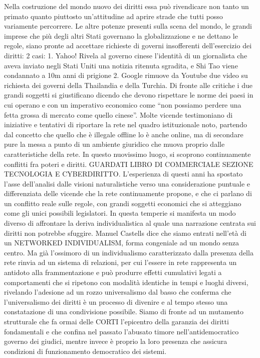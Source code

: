 Nella costruzione del mondo nuovo dei diritti essa può rivendicare non tanto un primato quanto piuttosto un’attitudine ad aprire strade che tutti posso variamente percorrere. Le altre potenze presenti sulla scena del mondo, le grandi imprese che più degli altri Stati governano la globalizzazione e ne dettano le regole, siano pronte ad accettare richieste di governi insofferenti dell’esercizio dei diritti: 2 casi:
1.	Yahoo! Rivela al governo cinese l’identità di un giornalista che aveva inviato negli Stati Uniti una notizia ritenuta sgradita, e Shi Tao viene condannato a 10m anni di prigione
2.	Google rimuove da Youtube due video su richiesta dei governi della Thailandia e della Turchia. 
Di fronte alle critiche i due grandi soggetti si giustificano dicendo che devono rispettare le norme dei paesi in cui operano e con un imperativo economico come “non possiamo perdere una fetta grossa di mercato come quello cinese”.
Molte vicende testimoniano di iniziative e tentativi di riportare la rete nel quadro istituzionale noto, partendo dal concetto che quello che è illegale offline lo è anche online, ma di secondare pure la messa a punto di un ambiente giuridico che muova proprio dalle caratteristiche della rete. In questo nuovissimo luogo, si scoprono continuamente conflitti fra poteri e diritti.
GUARDATI LIBRO DI COMMERCIALE SEZIONE TECNOLOGIA E CYBERDIRITTO.
L’esperienza di questi anni ha spostato l’asse dell’analisi dalle visioni naturalistiche verso una considerazione puntuale e differenziata delle vicende che la rete continuamente propone, e che ci parlano di un conflitto reale sulle regole, con grandi soggetti economici che si atteggiano come gli unici possibili legislatori.
In questa temperie si manifesta un modo diverso di affrontare la deriva individualistica al quale una narrazione centrata sui diritti non potrebbe sfuggire. Manuel Castells dice che siamo entrati nell’età di un NETWORKED INDIVIDUALISM, forma congeniale ad un mondo senza centro.
Ma già l’ossimoro di un individualismo caratterizzato dalla presenza della rete rinvia ad un sistema di relazioni, per cui l’essere in rete rappresenta un antidoto alla frammentazione e può produrre effetti cumulativi legati a comportamenti che si ripetono con modalità identiche in tempi e luoghi diversi, rivelando l’adesione ad un rozzo universalismo dal basso che conferma che l’universalismo dei diritti è un processo di divenire e al tempo stesso una constatazione di una condivisione possibile.
Siamo di fronte ad un mutamento strutturale che fa ormai delle CORTI l’epicentro della garanzia dei diritti fondamentali e che confina nel passato l’abusato timore nell’antidemocratico governo dei giudici, mentre invece è proprio la loro presenza che assicura condizioni di funzionamento democratico dei sistemi.

